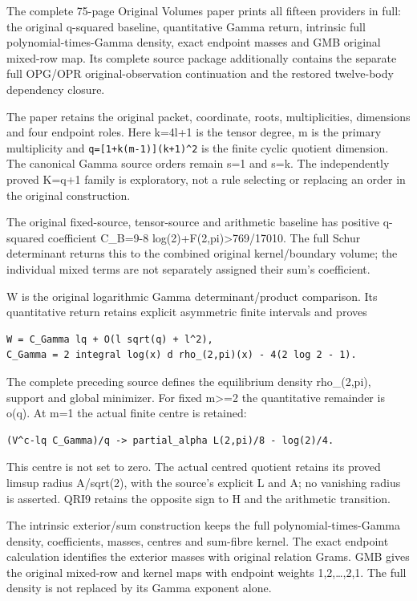 \documentclass[
]{article}
\begin{document}
The complete 75-page Original Volumes paper prints all fifteen providers
in full: the original q-squared baseline, quantitative Gamma return,
intrinsic full polynomial-times-Gamma density, exact endpoint masses and
GMB original mixed-row map. Its complete source package additionally
contains the separate full OPG/OPR original-observation continuation and
the restored twelve-body dependency closure.

The paper retains the original packet, coordinate, roots,
multiplicities, dimensions and four endpoint roles. Here k=4l+1 is the
tensor degree, m is the primary multiplicity and
\texttt{q={[}1+k(m-1){]}(k+1)\^{}2} is the finite cyclic quotient
dimension. The canonical Gamma source orders remain s=1 and s=k. The
independently proved K=q+1 family is exploratory, not a rule selecting
or replacing an order in the original construction.

The original fixed-source, tensor-source and arithmetic baseline has
positive q-squared coefficient C\_B=9-8
log(2)+F(2,pi)\textgreater769/17010. The full Schur determinant returns
this to the combined original kernel/boundary volume; the individual
mixed terms are not separately assigned their sum's coefficient.

W is the original logarithmic Gamma determinant/product comparison. Its
quantitative return retains explicit asymmetric finite intervals and
proves

\begin{verbatim}
W = C_Gamma lq + O(l sqrt(q) + l^2),
C_Gamma = 2 integral log(x) d rho_(2,pi)(x) - 4(2 log 2 - 1).
\end{verbatim}

The complete preceding source defines the equilibrium density
rho\_(2,pi), support and global minimizer. For fixed m\textgreater=2 the
quantitative remainder is o(q). At m=1 the actual finite centre is
retained:

\begin{verbatim}
(V^c-lq C_Gamma)/q -> partial_alpha L(2,pi)/8 - log(2)/4.
\end{verbatim}

This centre is not set to zero. The actual centred quotient retains its
proved limsup radius A/sqrt(2), with the source's explicit L and A; no
vanishing radius is asserted. QRI9 retains the opposite sign to H and
the arithmetic transition.

The intrinsic exterior/sum construction keeps the full
polynomial-times-Gamma density, coefficients, masses, centres and
sum-fibre kernel. The exact endpoint calculation identifies the exterior
masses with original relation Grams. GMB gives the original mixed-row
and kernel maps with endpoint weights 1,2,\ldots,2,1. The full density
is not replaced by its Gamma exponent alone.
\end{document}
